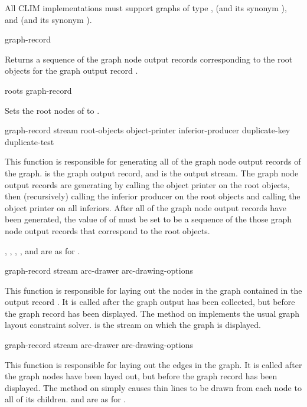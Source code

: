 All CLIM implementations must support graphs of type ,
 (and its synonym ), and
 (and its synonym ).


 {graph-record}

Returns a sequence of the graph node output records corresponding to the root
objects for the graph output record .

 {roots graph-record}

Sets the root nodes of  to .


 {graph-record stream
                                    root-objects object-printer inferior-producer 
                                    \key duplicate-key duplicate-test}

This function is responsible for generating all of the graph node output records
of the graph.   is the graph output record, and 
is the output stream.  The graph node output records are generating by calling
the object printer on the root objects, then (recursively) calling the inferior
producer on the root objects and calling the object printer on all inferiors.
After all of the graph node output records have been generated, the value of
 of  must be set to be a sequence of the
those graph node output records that correspond to the root objects.

, , ,
, and  are as for
.

 {graph-record stream arc-drawer arc-drawing-options} 

This function is responsible for laying out the nodes in the graph contained in
the output record .  It is called after the graph output has
been collected, but before the graph record has been displayed.  The method on
 implements the usual graph layout constraint
solver.   is the stream on which the graph is displayed.

 {graph-record stream arc-drawer arc-drawing-options}

This function is responsible for laying out the edges in the graph.  It is
called after the graph nodes have been layed out, but before the graph record
has been displayed.  The method on  simply
causes thin lines to be drawn from each node to all of its children.
 and  are as for .


